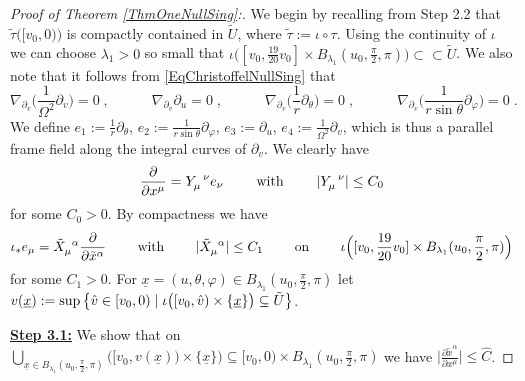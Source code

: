 \documentclass[reqno]{article}
\newcommand{\rd}{\partial}
\begin{document}
\begin{proof}[Proof of Theorem \ref{ThmOneNullSing}:]
We begin by recalling from Step 2.2 that $\tilde{\tau}\big([v_0, 0)\big) $ is compactly contained in $\tilde{U}$, where $\tilde{\tau} := \iota \circ \tau$. Using the continuity of $\iota$ we can choose $\lambda_1 >0$ so small that $\iota\Big( [v_0, \frac{19}{20} v_0] \times B_{\lambda_1}(u_0, \frac{\pi}{2}, \pi) \Big) \subset \subset \tilde{U}$. We also note that it follows from \eqref{EqChristoffelNullSing} that
\begin{equation}\label{EqParallelTAlongV}
\nabla_{\partial_v} \Big( \frac{1}{\Omega^2} \partial_v\Big) = 0\;, \qquad \quad \nabla_{\rd_v} \rd_u = 0\;, \qquad \quad \nabla_{\rd_v} \Big( \frac{1}{r} \rd_\theta\Big) = 0\;, \qquad \quad \nabla_{\rd_v} \Big(\frac{1}{r \sin \theta} \rd_\varphi \Big) = 0 \;.
\end{equation}
We define $e_1 := \frac{1}{r} \rd_\theta$, $e_2:= \frac{1}{r \sin \theta} \rd_\varphi$, $e_3 := \rd_u$, $e_4 := \frac{1}{\Omega^2} \rd_v$, which is thus a parallel frame field along the integral curves of $\partial_v$. We clearly have
\begin{equation}
\label{EqRelY}
\frac{\partial}{\rd x^\mu} = Y_\mu^{\; \; \nu} e_\nu \qquad \textnormal{ with } \qquad |Y_\mu^{\; \; \nu}| \leq C_0
\end{equation}
for some $C_0 > 0$. By compactness we have
\begin{equation}
\label{EqRelXTilde}
\iota_* e_\mu = \tilde{X}_\mu^{\; \; \alpha} \frac{\rd}{\rd \tilde{x}^\alpha} \qquad \textnormal{ with } \qquad |\tilde{X}_{\mu}^{\; \; \alpha} | \leq C_1 \qquad \textnormal{ on } \qquad \iota\Big([v_0, \frac{19}{20} v_0] \times B_{\lambda_1}(u_0, \frac{\pi}{2}, \pi)\Big) 
\end{equation}
for some $C_1 > 0$. For $\underline{x} = (u, \theta, \varphi) \in B_{\lambda_1}(u_0, \frac{\pi}{2}, \pi)$ let $v(\underline{x}) := \sup\big{\{} \hat{v} \in [v_0,0) \; | \; \iota\big([v_0, \hat{v}) \times \{\underline{x}\} \big) \subseteq \tilde{U} \big{\}}$.
\newline

\underline{\textbf{Step 3.1:}} We show that on $\bigcup_{\underline{x} \in B_{\lambda_1}(u_0, \frac{\pi}{2}, \pi)} \Big(\big[v_0, v(\underline{x})\big) \times \{\underline{x}\}\Big) \subseteq [v_0, 0) \times B_{\lambda_1}(u_0, \frac{\pi}{2}, \pi)$ we have $\Big|\frac{\rd \tilde{x}^\alpha}{\rd x^\mu} \Big| \leq \hat{C}$.
\newline
 

\end{proof}
\end{document}
